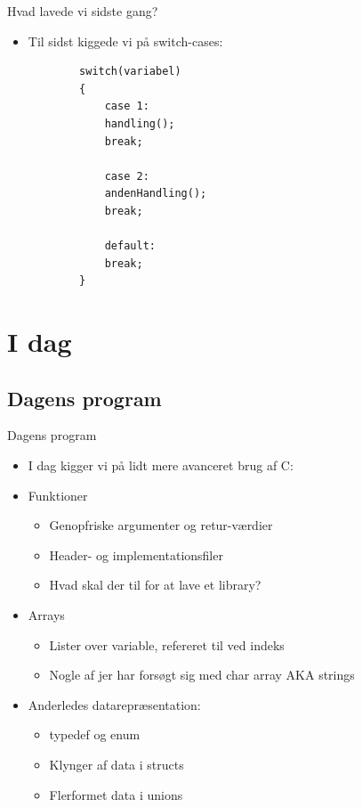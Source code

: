 \documentclass{beamer}
\begin{document}

\begin{frame}[fragile]{Hvad lavede vi sidste gang?}
	\begin{itemize}
		\item{Til sidst kiggede vi på {\color{C_darkblue}switch}-cases:}
		\begin{lstlisting}
		switch(variabel)
		{
			case 1:
			handling();
			break;

			case 2:
			andenHandling();
			break;

			default:
			break;
		}
		\end{lstlisting}
	\end{itemize}
\end{frame}

\section{I dag}
\subsection{Dagens program}

\begin{frame}[fragile]{Dagens program}
	\begin{itemize}
		\item{I dag kigger vi på lidt mere avanceret brug af C:}
		\item{Funktioner}
		\begin{itemize}
			\item{Genopfriske argumenter og retur-værdier}
			\item{Header- og implementationsfiler}
			\item{Hvad skal der til for at lave et library?}
		\end{itemize}
		\item{Arrays}
		\begin{itemize}
			\item{Lister over variable, refereret til ved indeks}
			\item{Nogle af jer har forsøgt sig med char array AKA strings}
		\end{itemize}
		\item{Anderledes datarepræsentation:}
		\begin{itemize}
			\item{{\color{C_darkblue}typedef} og {\color{C_darkblue}enum}}
			\item{Klynger af data i {\color{C_darkblue}structs}}
			\item{Flerformet data i {\color{C_darkblue}unions}}
		\end{itemize}
	\end{itemize}
\end{frame}
\end{document}
